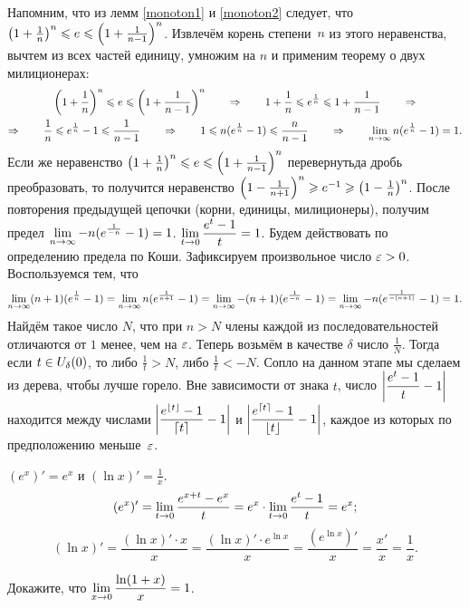 \documentclass[a4paper,12pt]{article}
\begin{document}
Напомним, что из лемм \ref{monoton1} и \ref{monoton2} следует, что
$\left(1+\frac{1}{n}\right)^n \leqslant e \leqslant \left(1+\frac{1}{n-1}\right)^n$.
Извлечём корень степени~$n$ из этого неравенства, вычтем из всех частей единицу,
умножим на $n$ и применим теорему о двух милиционерах:
\begin{multline*}
\left(1+\frac{1}{n}\right)^n \leqslant e \leqslant \left(1+\frac{1}{n-1}\right)^n
\qquad\Rightarrow\qquad
1+\frac{1}{n} \leqslant e^{\frac{1}{n}} \leqslant 1+\frac{1}{n-1}
\qquad\Rightarrow\\\Rightarrow\qquad
\frac{1}{n} \leqslant e^{\frac{1}{n}} - 1\leqslant \frac{1}{n-1}
\qquad\Rightarrow\qquad
1 \leqslant n(e^{\frac{1}{n}} - 1) \leqslant \frac{n}{n-1}
\qquad\Rightarrow\qquad
\lim\limits_{n \rightarrow \infty} n(e^{\frac{1}{n}} - 1) = 1.
\end{multline*}
Если же неравенство $\left(1+\frac{1}{n}\right)^n \leqslant e \leqslant \left(1+\frac{1}{n-1}\right)^n$  перевернуть да дробь преобразовать,
то получится неравенство $\left(1-\frac{1}{n+1}\right)^n \geqslant e^{-1} \geqslant \left(1-\frac{1}{n}\right)^n$.
После повторения предыдущей цепочки (корни, единицы, милиционеры), получим предел $\lim\limits_{n \rightarrow \infty} -n(e^{\frac{1}{-n}} - 1) = 1$.
$\lim\limits_{t \rightarrow 0}\dfrac{e^t-1}{t} = 1$.
Будем действовать по определению предела по Коши.
Зафиксируем произвольное число $\varepsilon>0$.
Воспользуемся тем, что 
$$
\lim\limits_{n \rightarrow \infty} (n+1)(e^{\frac{1}{n}} - 1)
=
\lim\limits_{n \rightarrow \infty} n(e^{\frac{1}{n+1}} - 1)
=
\lim\limits_{n \rightarrow \infty} -(n+1)(e^{\frac{1}{-n}} - 1)
=
\lim\limits_{n \rightarrow \infty} -n(e^{\frac{1}{-(n+1)}} - 1) 
= 1.
$$
Найдём такое число $N$, что при $n>N$ члены каждой из последовательностей отличаются
от $1$ менее, чем на $\varepsilon$.
Теперь возьмём в качестве $\delta$ число $\frac{1}{N}$.
Тогда если $t\in U_\delta(0)$,
то либо $\frac{1}{t}>N$, либо $\frac{1}{t}<-N$.
Сопло на данном этапе мы сделаем из дерева, чтобы лучше горело.
Вне зависимости от знака $t$, 
число $\left|\dfrac{e^t-1}{t} - 1\right|$ находится между числами
$\left|\dfrac{e^{\left\lfloor t\right\rfloor}-1}{\left\lceil t\right\rceil}-1\right|$ и $\left|\dfrac{e^{\left\lceil t\right\rceil}-1}{\left\lfloor t\right\rfloor}-1\right|$,
каждое из которых по предположению меньше~$\varepsilon$.

$(e^x)' = e^x$ и $(\ln x)' = \frac{1}{x}$.
$$
(e^x)' = \lim\limits_{t \rightarrow 0}\frac{e^{x+t} - e^x}{t} = e^x \cdot \lim\limits_{t \rightarrow 0}\frac{e^t - 1}{t} = e^x;
$$
$$
(\ln x)' = \frac{(\ln x)' \cdot x}{x} = \frac{(\ln x)' \cdot e^{\ln x}}{x} = \frac{(e^{\ln x})'}{x} = \frac{x'}{x} = \frac{1}{x}.
$$

Докажите, что $\lim\limits_{x \rightarrow 0}\dfrac{\ln(1+x)}{x} = 1$.
\end{document}
